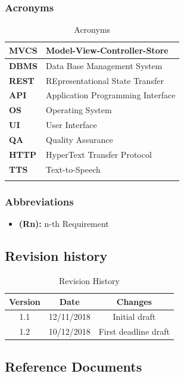 \documentclass[titlepage]{article}
\begin{document}
	
	\subsubsection{Acronyms}
	
	\begin{longtable}{| p{2 cm} | p{7 cm} |} \hline
		{\bf MVCS} & Model-View-Controller-Store \\\hline
		{\bf DBMS} & Data Base Management System \\ \hline
		{\bf REST} & REpresentational State Transfer \\ \hline
		{\bf API} & Application Programming Interface \\ \hline
		{\bf OS} & Operating System\\ \hline
		{\bf UI} & User Interface \\ \hline
		{\bf QA} & Quality Assurance \\ \hline		
		{\bf HTTP} & HyperText Transfer Protocol \\ \hline	
		{\bf TTS} & Text-to-Speech \\ \hline
		\caption{Acronyms}	
						
	\end{longtable}

	\subsubsection{Abbreviations}
	
	\begin{itemize}
		\item {\bf (Rn):} n-th Requirement
	\end{itemize}
			
			
\subsection{Revision history}

\begin{table}[ht]
	\centering
	\begin{tabular}{ccc} 
		Version & Date & Changes  \\ 
		\hline
		1.1 & 12/11/2018 & Initial draft \\
		1.2 & 10/12/2018 & First deadline draft \\
	\end{tabular}
	\caption{Revision History}
	\label{default}
\end{table}
	
	
\subsection{Reference Documents}
\end{document}

